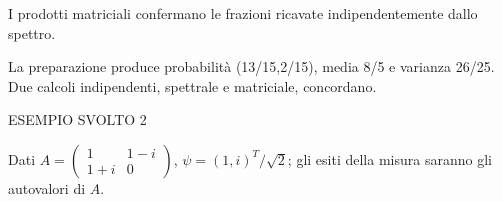 I prodotti matriciali confermano le frazioni ricavate indipendentemente dallo spettro.\par



La preparazione produce probabilità (13/15,2/15), media 8/5 e varianza 26/25. Due calcoli indipendenti, spettrale e matriciale, concordano.\par


\Needspace{.36\textheight}\label{c2-esperimento-example-2}
{\sffamily\small\color{Accent} ESEMPIO SVOLTO 2\par}
Dati \(A=\)\(\begin{pmatrix}1&1- i\\1+i&0\end{pmatrix}\), \(\psi =(1,\allowbreak i)^{T}/\sqrt{2}\); gli esiti della misura saranno gli autovalori di \(A\).\par


